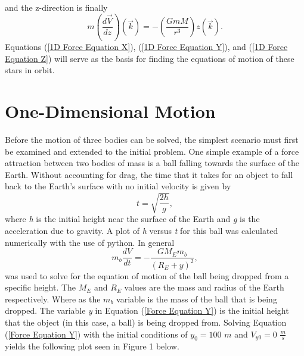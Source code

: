 \documentclass[twocolumn]{article}
\begin{document}
and the z-direction is finally
\begin{equation}\label{1D Force Equation Z}
m(\frac{d\Vec{V}}{dz})(\Vec{k})=-(\frac{GmM}{r^3})z(\Vec{k}).
\end{equation}
Equations (\ref{1D Force Equation X}), (\ref{1D Force Equation Y}), and (\ref{1D Force Equation Z}) will serve as the basis for finding the equations of motion of these stars in orbit.
\section{One-Dimensional Motion}
Before the motion of three bodies can be solved, the simplest scenario must first be examined and extended to the initial problem. One simple example of a force attraction between two bodies of mass is a ball falling towards the surface of the Earth. Without accounting for drag, the time that it takes for an object to fall back to the Earth's surface with no initial velocity is given by 
\begin{equation}\label{1D Time Equation}
t=\sqrt{\frac{2h}{g}},
\end{equation}
where \textit{h} is the initial height near the surface of the Earth and \textit{g} is the acceleration due to gravity. A plot of \textit{h} versus \textit{t} for this ball was calculated numerically with the use of python. In general
\begin{equation}\label{Force Equation Y}
m_{b}\frac{dV}{dt}=-\frac{GM_{E}m_{b}}{(R_{E}+y)^2},
\end{equation}
was used to solve for the equation of motion of the ball being dropped from a specific height. The $M_{E}$ and $R_{E}$ values are the mass and radius of the Earth respectively. Where as the $m_b$ variable is the mass of the ball that is being dropped. The variable \textit{y} in Equation (\ref{Force Equation Y}) is the initial height that the object (in this case, a ball) is being dropped from. Solving Equation (\ref{Force Equation Y}) with the initial conditions of $y_0=100$ $m$ and $V_{y0}=0$ $\frac{m}{s}$ yields the following plot seen in Figure 1 below.
\end{document}
